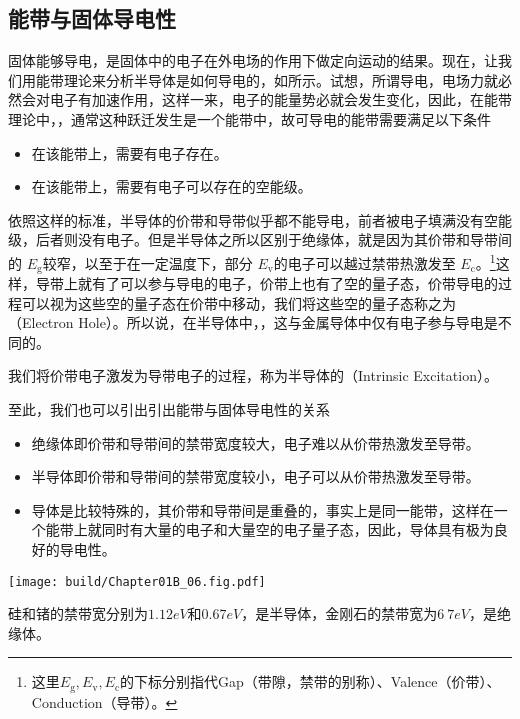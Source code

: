 \subsection{能带与固体导电性}
固体能够导电，是固体中的电子在外电场的作用下做定向运动的结果。现在，让我们用能带理论来分析半导体是如何导电的，如所示。试想，所谓导电，电场力就必然会对电子有加速作用，这样一来，电子的能量势必就会发生变化，因此，在能带理论中，，通常这种跃迁发生是一个能带中，故可导电的能带需要满足以下条件
\begin{itemize}
    \item 在该能带上，需要有电子存在。
    \item 在该能带上，需要有电子可以存在的空能级。
\end{itemize}
依照这样的标准，半导体的价带和导带似乎都不能导电，前者被电子填满没有空能级，后者则没有电子。但是半导体之所以区别于绝缘体，就是因为其价带和导带间的 $E_\text{g}$较窄，以至于在一定温度下，部分 $E_\text{v}$的电子可以越过禁带热激发至 $E_\text{c}$。\footnote{这里$E_\text{g},E_\text{v},E_\text{c}$的下标分别指代Gap（带隙，禁带的别称）、Valence（价带）、Conduction（导带）。}这样，导带上就有了可以参与导电的电子，价带上也有了空的量子态，价带导电的过程可以视为这些空的量子态在价带中移动，我们将这些空的量子态称之为（Electron Hole）。所以说，在半导体中，，这与金属导体中仅有电子参与导电是不同的。

我们将价带电子激发为导带电子的过程，称为半导体的（Intrinsic Excitation）。

\goodbreak

至此，我们也可以引出引出能带与固体导电性的关系
\begin{itemize}
    \item 绝缘体即价带和导带间的禁带宽度较大，电子难以从价带热激发至导带。
    \item 半导体即价带和导带间的禁带宽度较小，电子可以从价带热激发至导带。
    \item 导体是比较特殊的，其价带和导带间是重叠的，事实上是同一能带，这样在一个能带上就同时有大量的电子和大量空的电子量子态，因此，导体具有极为良好的导电性。
\end{itemize}

\begin{Figure}[半导体的能带]
    \texttt{[image: build/Chapter01B\_06.fig.pdf]}
\end{Figure}
硅和锗的禁带宽分别为$1.12\si{eV}$和$0.67\si{eV}$，是半导体，金刚石的禁带宽为$6~7\si{eV}$，是绝缘体。
